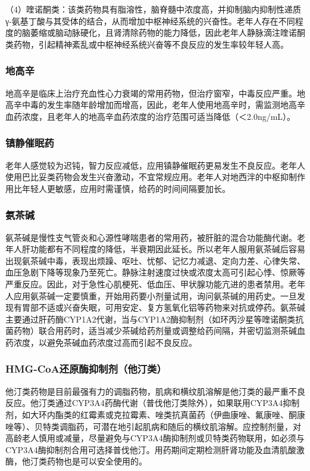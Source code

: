 （4）喹诺酮类：该类药物具有脂溶性，脑脊髓中浓度高，并抑制脑内抑制性递质γ-氨基丁酸与其受体的结合，从而增加中枢神经系统的兴奋性。老年人存在不同程度的脑萎缩或脑动脉硬化，且肾清除药物的能力降低，因此老年人静脉滴注喹诺酮类药物，引起精神紊乱或中枢神经系统兴奋等不良反应的发生率较年轻人高。

\subsubsection{地高辛}

地高辛是临床上治疗充血性心力衰竭的常用药物，但治疗窗窄，中毒反应严重。地高辛中毒的发生率随年龄增加而增高，因此，老年人使用地高辛时，需监测地高辛血药浓度，且老年人的地高辛血药浓度的治疗范围可适当降低（＜2.0ng/mL）。

\subsubsection{镇静催眠药}

老年人感觉较为迟钝，智力反应减低，应用镇静催眠药更易发生不良反应。老年人使用巴比妥类药物会发生兴奋激动，不宜常规应用。老年人对地西泮的中枢抑制作用比年轻人更敏感，应用时需谨慎，给药的时间间隔要加长。

\subsubsection{氨茶碱}

氨茶碱是慢性支气管炎和心源性哮喘患者的常用药，被肝脏的混合功能酶代谢。老年人肝功能都有不同程度的降低，半衰期因此延长。所以老年人服用氨茶碱后容易出现氨茶碱中毒，表现出烦躁、呕吐、忧郁、记忆力减退、定向力差、心律失常、血压急剧下降等现象乃至死亡。静脉注射速度过快或浓度太高可引起心悸、惊厥等严重反应。因此，对于急性心肌梗死、低血压、甲状腺功能亢进的患者禁用。老年人应用氨茶碱一定要慎重，开始用药要小剂量试用，询问氨茶碱的用药史。一旦发现有胃部不适或兴奋失眠，可用安定、复方氢氧化铝等药物来对抗或停药。氨茶碱主要通过肝药酶CYP1A2代谢，当与CYP1A2酶抑制剂（如环丙沙星等喹诺酮类抗菌药物）联合用药时，适当减少茶碱给药剂量或调整给药间隔，并密切监测茶碱血药浓度，以避免茶碱血药浓度过高而引起不良反应。

\subsubsection{HMG-CoA还原酶抑制剂（他汀类）}

他汀类药物是目前最强有力的调脂药物，肌病和横纹肌溶解是他汀类的最严重不良反应。他汀类通过CYP3A4药酶代谢（普伐他汀类除外），如果联用CYP3A4抑制剂，如大环内酯类的红霉素或克拉霉素、唑类抗真菌药（伊曲康唑、氟康唑、酮康唑等）、贝特类调脂药，可潜在地引起肌病和随后的横纹肌溶解。应控制剂量，对高龄老人慎用或减量，尽量避免与CYP3A4酶抑制剂或贝特类药物联用，如必须与CYP3A4酶抑制剂合用可选择普伐他汀。用药期间定期检测肝肾功能及血清肌酸激酶，他汀类药物也是可以安全使用的。


